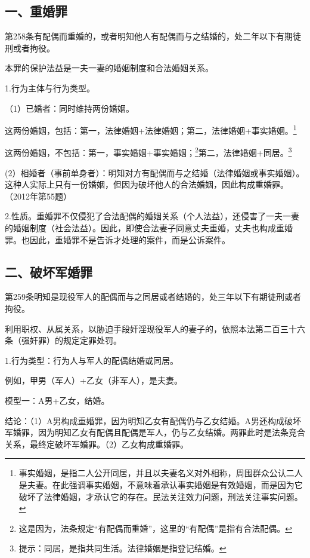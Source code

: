 \subsection*{一、重婚罪}

第258条有配偶而重婚的，或者明知他人有配偶而与之结婚的，处二年以下有期徒刑或者拘役。

本罪的保护法益是一夫一妻的婚姻制度和合法婚姻关系。

1.行为主体与行为类型。

（1）已婚者：同时维持两份婚姻。

这两份婚姻，包括：第一，法律婚姻+法律婚姻；第二，法律婚姻+事实婚姻。\footnote{事实婚姻，是指二人公开同居，并且以夫妻名义对外相称，周围群众公认二人是夫妻。在此强调事实婚姻，不意味着承认事实婚姻是有效婚姻，而是因为它破坏了法律婚姻，才承认它的存在。民法关注效力问题，刑法关注事实问题。}

这两份婚姻，不包括：第一，事实婚姻+事实婚姻；\footnote{这是因为，法条规定“有配偶而重婚”，这里的“有配偶”是指有合法配偶。}第二，法律婚姻+同居。\footnote{提示：同居，是指共同生活。法律婚姻是指登记结婚。}

(2）相婚者（事前单身者）：明知对方有配偶而与之结婚（法律婚姻或事实婚姻）。这种人实际上只有一份婚姻，但因为破坏他人的合法婚姻，因此构成重婚罪。（2012年第55题）

2.性质。重婚罪不仅侵犯了合法配偶的婚姻关系（个人法益），还侵害了一夫一妻的婚姻制度（社会法益）。因此，即使合法妻子同意丈夫重婚，丈夫也构成重婚罪。也因此，重婚罪不是告诉才处理的案件，而是公诉案件。

\subsection*{二、破坏军婚罪}

第259条明知是现役军人的配偶而与之同居或者结婚的，处三年以下有期徒刑或者拘役。

利用职权、从属关系，以胁迫手段奸淫现役军人的妻子的，依照本法第二百三十六条（强奸罪）的规定定罪处罚。

1.行为类型：行为人与军人的配偶结婚或同居。

例如，甲男（军人）+乙女（非军人），是夫妻。

模型一：A男+乙女，结婚。

结论：（1）A男构成重婚罪，因为明知乙女有配偶仍与乙女结婚。A男还构成破坏军婚罪，因为明知乙女有配偶且配偶是军人，仍与乙女结婚。两罪此时是法条竞合关系，最终定破坏军婚罪。（2）乙女构成重婚罪。

